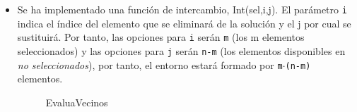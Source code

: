 \begin{itemize}
	
	
	
	\item Se ha implementado una función de intercambio, Int(sel,i,j). El parámetro \texttt{i} indica el índice del elemento que se eliminará de la solución y el j por cual se sustituirá. Por tanto, las opciones para \texttt{i} serán \texttt{m} (los m elementos seleccionados) y las opciones para \texttt{j} serán \texttt{n-m} (los elementos disponibles en \textit{no seleccionados}), por tanto, el entorno estará formado por \texttt{m$\cdot$(n-m)} elementos.
	
	
	
	\begin{figure}[H]
		\centering
		\begin{minipage}{.75\linewidth}
			
			\begin{algorithm}[H] 
				\caption{EvaluaVecinos }
				\SetAlgoLined
				
				
				
			\end{algorithm}
		\end{minipage}
	\end{figure}
	

\end{itemize}

